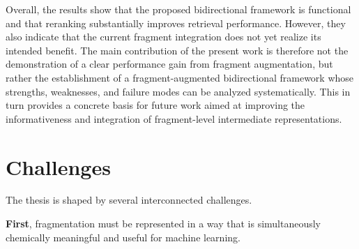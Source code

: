 Overall, the results show that the proposed bidirectional framework is functional and 
that reranking substantially improves retrieval performance. 
However, they also indicate that the current fragment integration does not yet realize its intended benefit. 
The main contribution of the present work is therefore not the demonstration of a clear 
performance gain from fragment augmentation, 
but rather the establishment of a fragment-augmented bidirectional framework whose strengths, weaknesses, 
and failure modes can be analyzed systematically. 
This in turn provides a concrete basis for future work aimed at improving the informativeness 
and integration of fragment-level intermediate representations.



%
%


\section{Challenges}
The thesis is shaped by several interconnected challenges. 

\textbf{First}, fragmentation must be represented in a way that is simultaneously chemically meaningful and useful for machine learning. 

